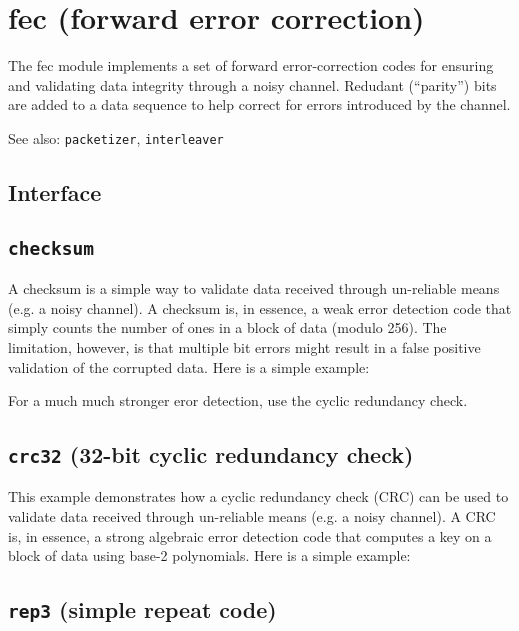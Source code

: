 % 
%

\section{fec (forward error correction)}
\label{module:fec}
The fec module implements a set of forward error-correction codes for
ensuring and validating data integrity through a noisy channel.
Redudant (``parity'') bits are added to a data sequence to help correct for
errors introduced by the channel.

See also: {\tt packetizer}, {\tt interleaver}

\subsection{Interface}
\label{module:fec:interface}

\subsection{{\tt checksum}}
\label{module:fec:checksum}
A checksum is a simple way to validate data received through un-reliable means
(e.g. a noisy channel).
A checksum is, in essence, a weak error detection code that simply counts the
number of ones in a block of data (modulo 256).
The limitation, however, is that multiple bit errors might result in a false
positive validation of the corrupted data.
Here is a simple example:
%

%
For a much much stronger eror detection, use the cyclic redundancy check.

\subsection{{\tt crc32} (32-bit cyclic redundancy check)}
\label{module:fec:crc32}
This example demonstrates how a cyclic redundancy check (CRC) can be used to
validate data received through un-reliable means (e.g. a noisy channel).
A CRC is, in essence, a strong algebraic error detection code that computes a
key on a block of data using base-2 polynomials.
Here is a simple example:
%


\subsection{{\tt rep3} (simple repeat code)}
\label{module:fec:rep3}

